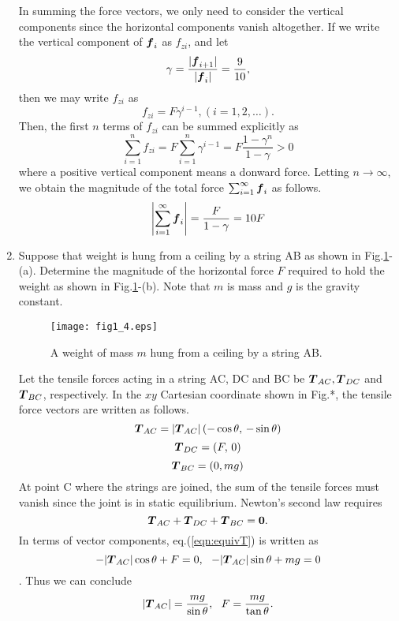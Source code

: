 \documentclass[10pt,a4j]{article}
\begin{document}
\begin{enumerate}
    {\small 
     In summing the force vectors, we only need to consider the vertical components since the horizontal components vanish altogether. If we write the vertical component of $\mbox{\boldmath $f$}_i$ as $f_{zi}$, and let 
        \[
            \gamma=\frac{|\mbox{\boldmath $f$}_{i+1}|}{|\mbox{\boldmath $f$}_i|}=\frac{9}{10},
        \]
        then we may write $f_{zi}$ as 
        \[
            f_{zi}=F\gamma^{i-1}, (i=1,2,\dots).
        \]
  Then, the first $n$ terms of $f_{zi}$ can be summed explicitly as  
        \[
            \sum_{i=1}^n f_{zi}=F\sum_{i=1}^n\gamma^{i-1}=F\frac{1-\gamma^n}{1-\gamma} >0
        \]
        where a positive vertical component means a donward force.
        Letting $n\rightarrow \infty$, we obtain the magnitude of the total force $\sum_{i=1}^\infty \mbox{\boldmath $f$}_i$ 
        as follows. 
        \[
            \left| \sum_{i=1}^\infty \mbox{\boldmath $f$}_i \right| =\frac{F}{1-\gamma}=10F
        \]
    }
\item
    Suppose that weight is hung from a ceiling by a string AB as shown in Fig.\ref{fig:fig1_4}-(a). Determine the magnitude of the horizontal force $F$ required to hold the weight as shown in Fig.\ref{fig:fig1_4}-(b).  Note that $m$ is mass and $g$ is the gravity constant. \\
    \begin{figure}[h]
    \begin{center}
    \texttt{[image: fig1\_4.eps]} 
    \end{center}
    \caption{A weight of mass $m$ hung from a ceiling by a string AB.} 
    \label{fig:fig1_4}
    \end{figure}

    {\small
        Let the tensile forces acting in a string AC, DC and BC be 
        $\mbox{\boldmath $T$}_{AC}, \mbox{\boldmath $T$}_{DC}$ and $\mbox{\boldmath $T$}_{BC}$, respectively. 
        In the $xy$ Cartesian coordinate shown in Fig.*, the tensile force vectors are written as follows.
        \[
            \mbox{\boldmath $T$}_{AC}=|\mbox{\boldmath $T$}_{AC}|\left(-\cos\theta,\, -\sin\theta \right)
        \]
        \[
            \mbox{\boldmath $T$}_{DC}=\left(F,\,0 \right)
        \]
        \[
            \mbox{\boldmath $T$}_{BC}=\left(0,mg \right)
        \]
        At point C where the strings are joined, the sum of the tensile forces must vanish since the joint is in static equilibrium. Newton's second law requires 
        \begin{equation}
            \mbox{\boldmath $T$}_{AC}+ \mbox{\boldmath $T$}_{DC}+\mbox{\boldmath $T$}_{BC}=\mbox{\boldmath $0$}.
            \label{eqn:equivT}
        \end{equation}
In terms of vector components, eq.(\ref{eqn:equivT}) is written as
        \begin{equation}
            -|\fat{T}_{AC}|\cos\theta+F=0
            ,\ \ 
            -|\fat{T}_{AC}|\sin\theta+mg=0
            \label{eqn:}
        \end{equation}.
Thus we can conclude
        \begin{equation}
            |\fat{T}_{AC}|=\frac{mg}{\sin\theta}, \ \ 
            F=\frac{mg}{\tan\theta}. 
            \label{eqn:}
        \end{equation}
    }
\end{enumerate}
\end{document}
